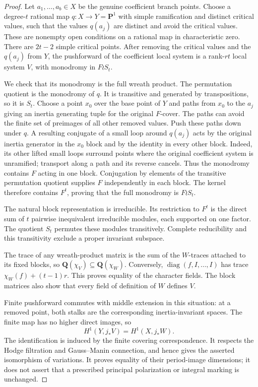 \documentclass[11pt]{article}
\theoremstyle{definition}
\theoremstyle{remark}
\newcommand{\Q}{\mathbf Q}
\begin{document}
\begin{proof}
Let $a_1,\ldots,a_b\in X$ be the genuine coefficient branch
points.  Choose a degree-$t$ rational map $q:X\to Y=\mathbf P^1$
with simple ramification and distinct critical values, such that
the values $q(a_j)$ are distinct and avoid the critical values.
These are nonempty open conditions on a rational map in
characteristic zero.  There are $2t-2$ simple critical points.
After removing the critical values and the $q(a_j)$ from $Y$,
the pushforward of the coefficient local system is a rank-$rt$
local system $V$, with monodromy in $F\wr S_t$.

We check that its monodromy is the full wreath product.  The
permutation quotient is the monodromy of $q$.  It is transitive
and generated by transpositions, so it is $S_t$.  Choose a point
$x_0$ over the base point of $Y$ and paths from $x_0$ to the
$a_j$ giving an inertia generating tuple for the original
$F$-cover.  The paths can avoid the finite set of preimages of
all other removed values.  Push these paths down under $q$.
A resulting conjugate of a small loop around $q(a_j)$ acts by
the original inertia generator in the $x_0$ block and by the
identity in every other block.  Indeed, its other lifted small
loops surround points where the original coefficient system is
unramified; transport along a path and its reverse cancels.
Thus the monodromy contains $F$ acting in one block.  Conjugation
by elements of the transitive permutation quotient supplies
$F$ independently in each block.  The kernel therefore contains
$F^t$, proving that the full monodromy is $F\wr S_t$.

The natural block representation is irreducible.  Its restriction
to $F^t$ is the direct sum of $t$ pairwise inequivalent
irreducible modules, each supported on one factor.  The quotient
$S_t$ permutes these modules transitively.  Complete reducibility
and this transitivity exclude a proper invariant subspace.

The trace of any wreath-product matrix is the sum of the
$W$-traces attached to its fixed blocks, so
$\Q(\chi_V)\subseteq\Q(\chi_W)$.  Conversely,
$\operatorname{diag}(f,I,\ldots,I)$ has trace
$\chi_W(f)+(t-1)r$.  This proves equality of the character
fields.  The block matrices also show that every field of
definition of $W$ defines $V$.

Finite pushforward commutes with middle extension in this
situation: at a removed point, both stalks are the corresponding
inertia-invariant spaces.  The finite map has no higher direct
images, so
\[
 H^1(Y,j_*V)=H^1(X,j_*W).
\]
The identification is induced by the finite covering
correspondence.  It respects the Hodge filtration and
Gauss--Manin connection, and hence gives the asserted isomorphism
of variations.  It proves equality of their period-image
dimensions; it does not assert that a prescribed principal
polarization or integral marking is unchanged.


\end{proof}
\end{document}
